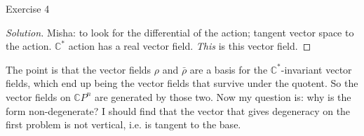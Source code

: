 \begin{thing4}{Exercise 4}\label{exer:4}\leavevmode

\end{thing4}

\begin{proof}[Solution]\leavevmode
Misha: to look for the differential of the action; tangent vector space to the action. \(\mathbb{C}^*\) action has a real vector field. \textit{This} is this vector field.
\end{proof}

\begin{remark}[Dani]\leavevmode
The point is that the vector fields \(\rho\) and \(\bar{\rho} \) are a basis for the \(\mathbb{C}^*\)-invariant vector fields, which end up being the vector fields that survive under the quotent. So the vector fields on \(\mathbb{C}P^n\) are generated by those two. Now my question is: why is the form non-degenerate? I should find that the vector that gives degeneracy on the first problem is not vertical, i.e. is tangent to the base.
\end{remark}

